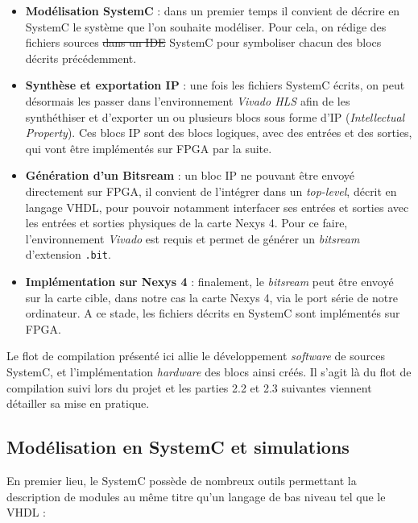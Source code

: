 \documentclass[a4paper,12pt]{article}
\begin{document}
\begin{itemize}
\item[\textbullet] \textbf{Modélisation SystemC} : dans un premier temps il convient de décrire en SystemC le système que l'on souhaite modéliser. Pour cela, on rédige des fichiers sources \sout{dans un IDE} SystemC pour symboliser chacun des blocs décrits précédemment. \\
\item[\textbullet] \textbf{Synthèse et exportation IP} : une fois les fichiers SystemC écrits, on peut désormais les passer dans l'environnement \textit{Vivado HLS} afin de les synthéthiser et d'exporter un ou plusieurs blocs sous forme d'IP (\textit{Intellectual Property}). Ces blocs IP sont des blocs logiques, avec des entrées et des sorties, qui vont être implémentés sur FPGA par la suite. \\
\item[\textbullet] \textbf{Génération d'un Bitsream} : un bloc IP ne pouvant être envoyé directement sur FPGA, il convient de l'intégrer dans un \textit{top-level}, décrit en langage VHDL, pour pouvoir notamment interfacer ses entrées et sorties avec les entrées et sorties physiques de la carte Nexys 4. Pour ce faire, l'environnement \textit{Vivado} est requis et permet de générer un \textit{bitsream} d'extension \texttt{.bit}. \\
\item[\textbullet] \textbf{Implémentation sur Nexys 4} : finalement, le \textit{bitsream} peut être envoyé sur la carte cible, dans notre cas la carte Nexys 4, via le port série de notre ordinateur. A ce stade, les fichiers décrits en SystemC sont implémentés sur FPGA.\\
\end{itemize}
Le flot de compilation présenté ici allie le développement \textit{software} de sources SystemC, et l'implémentation \textit{hardware} des blocs ainsi créés. Il s'agit là du flot de compilation suivi lors du projet et les parties 2.2 et 2.3 suivantes viennent détailler sa mise en pratique.


\subsection{Modélisation en SystemC et simulations}
En premier lieu, le SystemC possède de nombreux outils permettant la description de modules au même titre qu'un langage de bas niveau tel que le VHDL :\\
\end{document}
